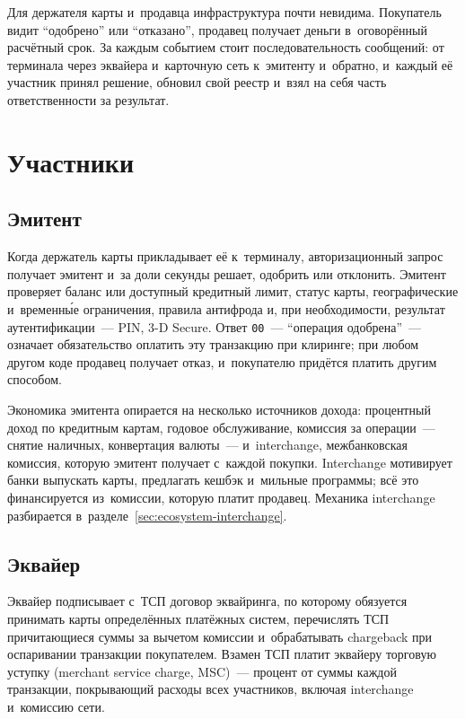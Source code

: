 Для держателя карты и~продавца инфраструктура почти невидима.
Покупатель видит \enquote{одобрено} или \enquote{отказано}, продавец получает
деньги в~оговорённый расчётный срок. За каждым событием стоит последовательность
сообщений: от терминала через эквайера и~карточную сеть к~эмитенту и~обратно,
и~каждый её участник принял решение, обновил свой реестр и~взял на себя часть
ответственности за результат.

\section{Участники}\label{sec:ecosystem-participants}

\subsection*{Эмитент}

Когда держатель карты прикладывает её к~терминалу, авторизационный запрос
получает эмитент и~за доли секунды решает, одобрить или отклонить. Эмитент
проверяет баланс или доступный кредитный лимит, статус карты, географические
и~временн\'{ы}е ограничения, правила антифрода и, при необходимости, результат
аутентификации~--- PIN, 3-D Secure. Ответ \texttt{00}~--- \enquote{операция
одобрена}~--- означает обязательство оплатить эту транзакцию при клиринге;
при любом другом коде продавец получает отказ, и~покупателю придётся платить
другим способом.

Экономика эмитента опирается на несколько источников дохода: процентный доход
по кредитным картам, годовое обслуживание, комиссия за операции~--- снятие
наличных, конвертация валюты~--- и~interchange, межбанковская комиссия, которую
эмитент получает с~каждой покупки. Interchange мотивирует банки выпускать карты, предлагать кешбэк и~мильные программы; всё
это финансируется из~комиссии, которую платит продавец. Механика interchange
разбирается в~разделе~\ref{sec:ecosystem-interchange}.

\subsection*{Эквайер}

Эквайер подписывает с~ТСП договор эквайринга, по которому обязуется принимать карты
определённых платёжных систем, перечислять ТСП причитающиеся суммы за вычетом
комиссии и~обрабатывать chargeback при оспаривании транзакции покупателем.
Взамен ТСП платит эквайеру торговую уступку (merchant service charge, MSC)~---
процент от суммы каждой транзакции, покрывающий расходы всех участников,
включая interchange и~комиссию сети.

